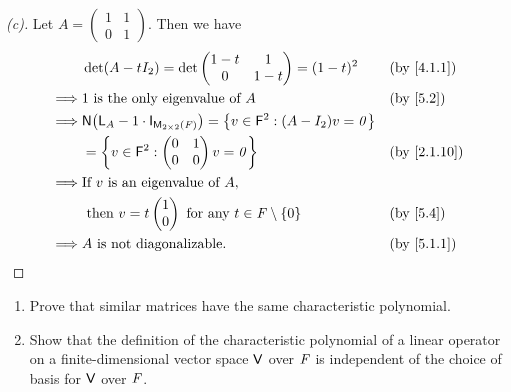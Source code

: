 \begin{proof}[(c)]
	Let \(A = \begin{pmatrix}
		1 & 1 \\
		0 & 1
	\end{pmatrix}\).
	Then we have
	\begin{align*}
		         & \det(A - t I_2) = \det\begin{pmatrix}
			                                 1 - t & 1     \\
			                                 0     & 1 - t
		                                 \end{pmatrix} = (1 - t)^2                                             &  & \by{4.1.1}         \\
		\implies & 1 \text{ is the only eigenvalue of } A                                            &  & \by{5.2}                     \\
		\implies & \ns{\L_A - 1 \cdot \IT[\ms[2][2][\F]]} = \set{v \in \vs{F}^2 : (A - I_2) v = \zv}                                   \\
		         & = \set{v \in \vs{F}^2 : \begin{pmatrix}
				                                   0 & 1 \\
				                                   0 & 0
			                                   \end{pmatrix} v = \zv}                                           &  & \by{2.1.10}           \\
		\implies & \text{If } v \text{ is an eigenvalue of } A,                                                                        \\
		         & \text{ then } v = t \begin{pmatrix}
			                               1 \\
			                               0
		                               \end{pmatrix} \text{ for any } t \in \F \setminus \set{0}                         &  & \by{5.4} \\
		\implies & A \text{ is not diagonalizable}.                                                  &  & \by{5.1.1}
	\end{align*}
\end{proof}

\begin{ex}\label{ex:5.1.12}
	\begin{enumerate}
		\item Prove that similar matrices have the same characteristic polynomial.
		\item Show that the definition of the characteristic polynomial of a linear operator on a finite-dimensional vector space \(\mathsf{V}\) over \(\mathit{F}\) is independent of the choice of basis for \(\mathsf{V}\) over \(\mathit{F}\).
	\end{enumerate}
\end{ex}

